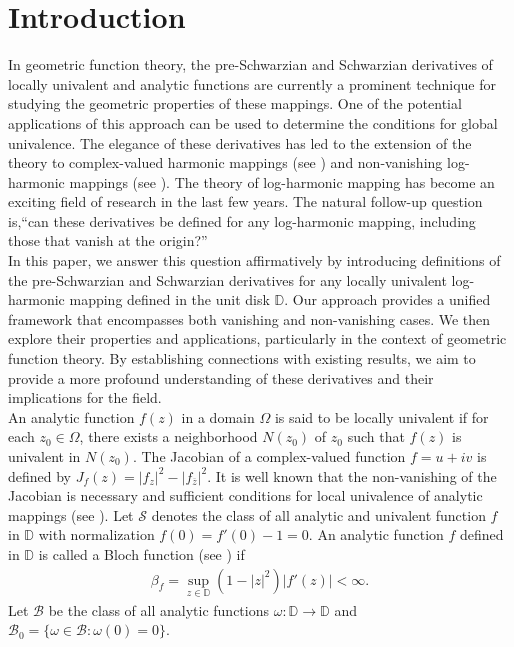 \documentclass[12pt,reqno]{amsart}
\newtheorem{open problem}{Open problem}[section]
\newcommand{\beas}{\begin{eqnarray*}}
\newcommand{\eeas}{\end{eqnarray*}}
\numberwithin{equation}{section}
\begin{document}
\section{Introduction}
\noindent In geometric function theory, the pre-Schwarzian and Schwarzian derivatives of locally univalent and analytic functions are currently a prominent technique for studying the geometric properties of these mappings. One of the potential applications of this approach can be used to determine the conditions for global univalence. The elegance of these derivatives has led to the extension of the theory to complex-valued harmonic mappings (see \cite{CDO2003,HM2015}) and non-vanishing log-harmonic mappings (see \cite{1LP2018, BHPV2022}). The theory of log-harmonic mapping has become an exciting field of research in the last few years. 
The natural follow-up question is,``can these derivatives be defined for any log-harmonic mapping, including those that vanish at the origin?''\\[2mm]
\indent In this paper, we answer this question affirmatively by introducing definitions of the pre-Schwarzian and Schwarzian derivatives for any locally univalent log-harmonic mapping defined in the unit disk $\mathbb{D}$. Our approach provides a unified framework that encompasses both vanishing and non-vanishing cases. We then explore their properties and applications, particularly in the context of geometric function theory. By establishing connections with existing results, we aim to provide a more profound understanding of these derivatives and their implications for the field.\\[2mm]
\indent An analytic function $f(z)$ in a domain $\Omega$ is said to be locally univalent if for each $z_0\in\Omega$, there exists a neighborhood $N(z_0)$ of 
$z_0$ such that $f(z)$ is univalent in $N(z_0)$. The Jacobian of a complex-valued function $f=u+i v$ is defined by $J_f(z)=|f_z|^2 - |f_{\overline{z}}|^2$. 
It is well known that the non-vanishing of the Jacobian is necessary and sufficient conditions for local univalence of analytic mappings (see \cite[Chapter 1]{D1983}). 
Let $\mathcal{S}$ denotes the class of all analytic and univalent function $f$ in $\mathbb{D}$ with normalization $f(0)=f'(0)-1=0$.  An analytic function $f$ defined in $\mathbb{D}$ is called a Bloch function (see \cite{ACP1974, P1970}) if
\beas \beta_f=\sup_{z\in\mathbb{D}}(1-|z|^2)|f'(z)|<\infty.\eeas
Let $\mathcal{B}$ be the class of all analytic functions $\omega:\mathbb{D}\rightarrow\mathbb{D}$ and $\mathcal{B}_0=\{\omega\in\mathcal{B} : \omega(0)=0\}$. 
\end{document}
